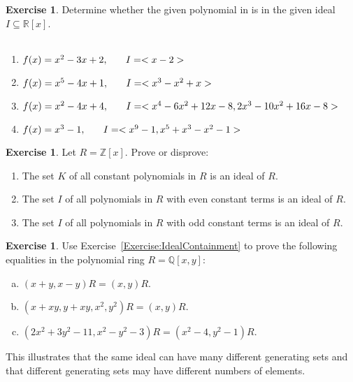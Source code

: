 \documentclass{amsart}
\theoremstyle{plain}
\theoremstyle{definition}
\newtheorem{exercise}[theorem]{Exercise}
\theoremstyle{definition}
\begin{document}
\begin{exercise} %
Determine whether the given polynomial in is in the given ideal $I \subseteq \mathbb R[x]$.
\begin{tabular}{l l }
\end{tabular}
\begin{enumerate} \item $f(x) = x^2 - 3x + 2, \hskip.25in I = <x-2>$ 

\item $f(x) = x^5 - 4x + 1, \hskip.25in I = <x^3-x^2+x>$ 

\item $f(x) = x^2 - 4x + 4, \hskip.25in I = <x^4 - 6x^2 + 12x - 8, 2x^3 - 10x^2 + 16x -8>$ 

\item $f(x) = x^3 - 1, \hskip.25in I = <x^9-1, x^5 + x^3 - x^2 -1>$ 
\end{enumerate}



\end{exercise}



\begin{exercise}\label{Exercise:IsAnIdeal?}
Let $R = \mathbb{Z}[x]$.  Prove or disprove:
\begin{enumerate}
\item The set $K$ of all constant polynomials in $R$ is an ideal
of $R$.
\item The set $I$ of all polynomials in $R$ with even constant terms is an ideal of
$R$.
\item The set $I$ of all polynomials in $R$ with odd constant terms is an ideal of
$R$.
\end{enumerate}
\end{exercise}


\begin{exercise}
Use Exercise~\ref{Exercise:IdealContainment} to prove the following equalities in the
polynomial ring $R = \mathbb{Q}[x, y]$:
\begin{enumerate}[a.]
\item $(x + y, x - y)R = (x, y)R$.

\item $(x + x y, y + x y, x^{2}, y^{2})R = (x, y)R$.

\item $(2x^{2} + 3y^{2} - 11, x^{2} - y^{2} - 3)R = (x^{2} - 4, y^{2} - 1)R$.
\end{enumerate}
This illustrates that the same ideal can have many different generating sets and that
different generating sets may have different numbers of elements.
\end{exercise}
\end{document}
